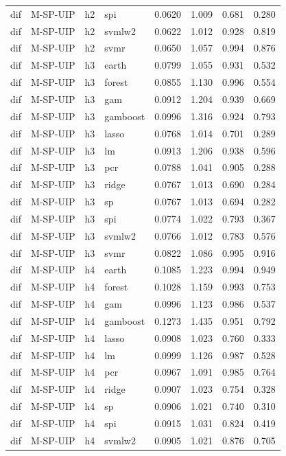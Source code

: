 \begin{ThreePartTable}
\begin{longtable}[t]{llclcccc}
dif & M-SP-UIP & h2 & spi & 0.0620 & 1.009 & 0.681 & 0.280\\
dif & M-SP-UIP & h2 & svmlw2 & 0.0622 & 1.012 & 0.928 & 0.819\\
dif & M-SP-UIP & h2 & svmr & 0.0650 & 1.057 & 0.994 & 0.876\\
\addlinespace
dif & M-SP-UIP & h3 & earth & 0.0799 & 1.055 & 0.931 & 0.532\\
dif & M-SP-UIP & h3 & forest & 0.0855 & 1.130 & 0.996 & 0.554\\
dif & M-SP-UIP & h3 & gam & 0.0912 & 1.204 & 0.939 & 0.669\\
dif & M-SP-UIP & h3 & gamboost & 0.0996 & 1.316 & 0.924 & 0.793\\
dif & M-SP-UIP & h3 & lasso & 0.0768 & 1.014 & 0.701 & 0.289\\
dif & M-SP-UIP & h3 & lm & 0.0913 & 1.206 & 0.938 & 0.596\\
dif & M-SP-UIP & h3 & pcr & 0.0788 & 1.041 & 0.905 & 0.288\\
dif & M-SP-UIP & h3 & ridge & 0.0767 & 1.013 & 0.690 & 0.284\\
dif & M-SP-UIP & h3 & sp & 0.0767 & 1.013 & 0.694 & 0.282\\
dif & M-SP-UIP & h3 & spi & 0.0774 & 1.022 & 0.793 & 0.367\\
dif & M-SP-UIP & h3 & svmlw2 & 0.0766 & 1.012 & 0.783 & 0.576\\
dif & M-SP-UIP & h3 & svmr & 0.0822 & 1.086 & 0.995 & 0.916\\
\addlinespace
dif & M-SP-UIP & h4 & earth & 0.1085 & 1.223 & 0.994 & 0.949\\
dif & M-SP-UIP & h4 & forest & 0.1028 & 1.159 & 0.993 & 0.753\\
dif & M-SP-UIP & h4 & gam & 0.0996 & 1.123 & 0.986 & 0.537\\
dif & M-SP-UIP & h4 & gamboost & 0.1273 & 1.435 & 0.951 & 0.792\\
dif & M-SP-UIP & h4 & lasso & 0.0908 & 1.023 & 0.760 & 0.333\\
dif & M-SP-UIP & h4 & lm & 0.0999 & 1.126 & 0.987 & 0.528\\
dif & M-SP-UIP & h4 & pcr & 0.0967 & 1.091 & 0.985 & 0.764\\
dif & M-SP-UIP & h4 & ridge & 0.0907 & 1.023 & 0.754 & 0.328\\
dif & M-SP-UIP & h4 & sp & 0.0906 & 1.021 & 0.740 & 0.310\\
dif & M-SP-UIP & h4 & spi & 0.0915 & 1.031 & 0.824 & 0.419\\
dif & M-SP-UIP & h4 & svmlw2 & 0.0905 & 1.021 & 0.876 & 0.705\\

\end{longtable}
\end{ThreePartTable}
